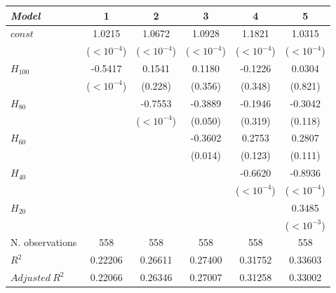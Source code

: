 \begin{tabular}{lccccc}
\toprule
\textit{Model} & 1 & 2 & 3 & 4 & 5 \\
\midrule
$\mathit{const}$ & 1.0215 & 1.0672 & 1.0928 & 1.1821 & 1.0315 \\
 & {\scriptsize ($<10^{-4}$)} & {\scriptsize ($<10^{-4}$)} & {\scriptsize ($<10^{-4}$)} & {\scriptsize ($<10^{-4}$)} & {\scriptsize ($<10^{-4}$)} \\
$H_{100}$ & -0.5417 & 0.1541 & 0.1180 & -0.1226 & 0.0304 \\
 & {\scriptsize ($<10^{-4}$)} & {\scriptsize (0.228)} & {\scriptsize (0.356)} & {\scriptsize (0.348)} & {\scriptsize (0.821)} \\
$H_{80}$ &  & -0.7553 & -0.3889 & -0.1946 & -0.3042 \\
 &  & {\scriptsize ($<10^{-4}$)} & {\scriptsize (0.050)} & {\scriptsize (0.319)} & {\scriptsize (0.118)} \\
$H_{60}$ &  &  & -0.3602 & 0.2753 & 0.2807 \\
 &  &  & {\scriptsize (0.014)} & {\scriptsize (0.123)} & {\scriptsize (0.111)} \\
$H_{40}$ &  &  &  & -0.6620 & -0.8936 \\
 &  &  &  & {\scriptsize ($<10^{-4}$)} & {\scriptsize ($<10^{-4}$)} \\
$H_{20}$ &  &  &  &  & 0.3485 \\
 &  &  &  &  & {\scriptsize ($<10^{-3}$)} \\
\midrule
N. observations & 558 & 558 & 558 & 558 & 558 \\
$R^2$ & 0.22206 & 0.26611 & 0.27400 & 0.31752 & 0.33603 \\
$\mathit{Adjusted}~R^2$ & 0.22066 & 0.26346 & 0.27007 & 0.31258 & 0.33002 \\
\bottomrule
\end{tabular}

